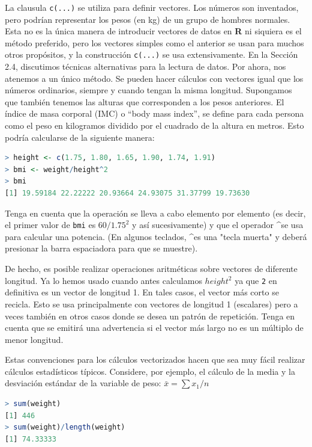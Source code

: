 \documentclass[spanish]{extbook}
\numberwithin{equation}{section}
\numberwithin{figure}{section}
\begin{document}
La clausula \texttt{c(...)} se utiliza para definir vectores. Los números son
inventados, pero podrían representar los pesos (en kg) de un grupo de hombres
normales. Esta no es la única manera de introducir vectores de datos en
\textbf{R} ni siquiera es el método preferido, pero los vectores simples como
el anterior se usan para muchos otros propósitos, y la construcción
\texttt{c(...)} se usa extensivamente. En la Sección 2.4, discutimos técnicas
alternativas para la lectura de datos. Por ahora, nos atenemos a un único
método. Se pueden hacer cálculos con vectores igual que los números ordinarios,
siempre y cuando tengan la misma longitud.  Supongamos que también tenemos las
alturas que corresponden a los pesos anteriores. El índice de masa corporal
(IMC) o ``body mass index'', se define para cada persona como el peso en
kilogramos dividido por el cuadrado de la altura en metros. Esto podría
calcularse de la siguiente manera:

\begin{lstlisting}[language=R]
> height <- c(1.75, 1.80, 1.65, 1.90, 1.74, 1.91) 
> bmi <- weight/height^2 
> bmi 
[1] 19.59184 22.22222 20.93664 24.93075 31.37799 19.73630
\end{lstlisting}

Tenga en cuenta que la operación se lleva a cabo elemento por elemento (es
decir, el primer valor de \texttt{bmi} es $60/1.75^2$ y así sucesivamente) y
que el operador \textasciicircum se usa para calcular una potencia. (En algunos
teclados, \textasciicircum es una "tecla muerta" y deberá presionar la barra
espaciadora para que se muestre).

De hecho, es posible realizar operaciones aritméticas sobre vectores de
diferente longitud. Ya lo hemos usado cuando antes calculamos $height^2$
ya que \texttt{2} en definitiva es un vector de longitud 1. En tales casos, el
vector más corto se recicla. Esto se usa principalmente con vectores de
longitud 1 (escalares) pero a veces también en otros casos donde se desea un
patrón de repetición. Tenga en cuenta que se emitirá una advertencia si el
vector más largo no es un múltiplo de menor longitud.

Estas convenciones para los cálculos vectorizados hacen que sea muy fácil
realizar cálculos estadísticos típicos. Considere, por ejemplo, el cálculo
de la media y la desviación estándar de la variable de peso: $\bar{x} = \sum x_1/n$

\begin{lstlisting}[language=R]
> sum(weight)
[1] 446
> sum(weight)/length(weight)
[1] 74.33333
\end{lstlisting}
\end{document}

